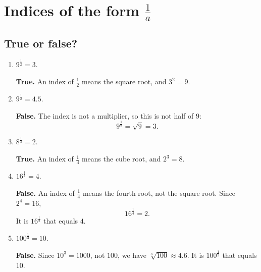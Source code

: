 \documentclass[11pt]{article}
\begin{document}
\section{Indices of the form \texorpdfstring{$\frac{1}{a}$}{1/a}}

\subsection*{True or false?}
\begin{enumerate}
\item $9^{\frac{1}{2}}=3$.

\textbf{True.} An index of $\frac{1}{2}$ means the square root, and $3^2=9$.

\item $9^{\frac{1}{2}}=4.5$.

\textbf{False.} The index is not a multiplier, so this is not half of $9$:
\[
9^{\frac{1}{2}}=\sqrt{9}=3.
\]

\item $8^{\frac{1}{3}}=2$.

\textbf{True.} An index of $\frac{1}{3}$ means the cube root, and $2^3=8$.

\item $16^{\frac{1}{4}}=4$.

\textbf{False.} An index of $\frac{1}{4}$ means the fourth root, not the square root. Since $2^4=16$,
\[
16^{\frac{1}{4}}=2.
\]
It is $16^{\frac{1}{2}}$ that equals $4$.

\item $100^{\frac{1}{3}}=10$.

\textbf{False.} Since $10^3=1000$, not $100$, we have $\sqrt[3]{100}\approx4.6$. It is $100^{\frac{1}{2}}$ that equals $10$.
\end{enumerate}
\end{document}
